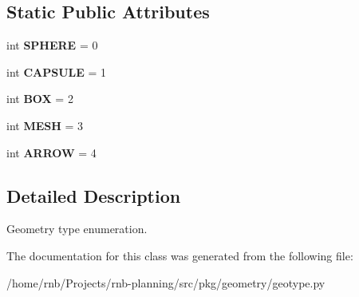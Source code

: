 \subsection*{Static Public Attributes}
\begin{DoxyCompactItemize}
\item 
\mbox{\label{classrnb-planning_1_1src_1_1pkg_1_1geometry_1_1geotype_1_1_g_e_o_t_y_p_e_aa16ff745abf9216823f9ba491404897c}} 
int {\bfseries S\+P\+H\+E\+RE} = 0
\item 
\mbox{\label{classrnb-planning_1_1src_1_1pkg_1_1geometry_1_1geotype_1_1_g_e_o_t_y_p_e_a9c794152250847ac6fe800d68d2530a8}} 
int {\bfseries C\+A\+P\+S\+U\+LE} = 1
\item 
\mbox{\label{classrnb-planning_1_1src_1_1pkg_1_1geometry_1_1geotype_1_1_g_e_o_t_y_p_e_a2269480f84d6e47abd80d4006d258766}} 
int {\bfseries B\+OX} = 2
\item 
\mbox{\label{classrnb-planning_1_1src_1_1pkg_1_1geometry_1_1geotype_1_1_g_e_o_t_y_p_e_a93986893f0a3e1f89712e16febe663a7}} 
int {\bfseries M\+E\+SH} = 3
\item 
\mbox{\label{classrnb-planning_1_1src_1_1pkg_1_1geometry_1_1geotype_1_1_g_e_o_t_y_p_e_aa3f797aa40564b5970b2a1c08e6bb864}} 
int {\bfseries A\+R\+R\+OW} = 4
\end{DoxyCompactItemize}


\subsection{Detailed Description}
Geometry type enumeration. 

The documentation for this class was generated from the following file\+:\begin{DoxyCompactItemize}
\item 
/home/rnb/\+Projects/rnb-\/planning/src/pkg/geometry/geotype.\+py\end{DoxyCompactItemize}
